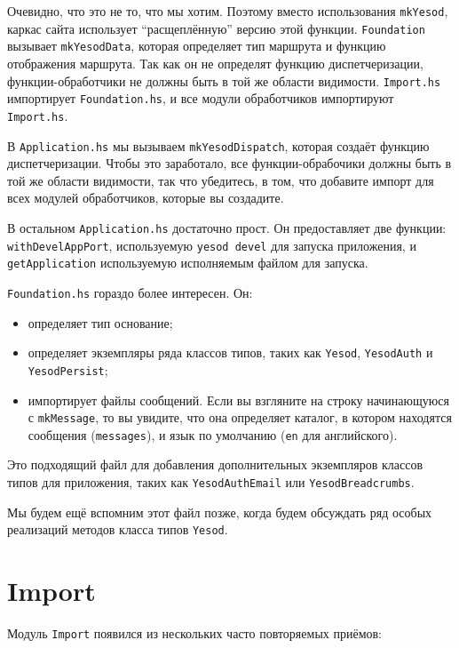 Очевидно, что это не то, что мы хотим. Поэтому вместо использования \lstinline!mkYesod!, каркас 
сайта использует ``расщеплённую'' версию этой функции. \lstinline!Foundation! вызывает \lstinline!mkYesodData!,
которая определяет тип маршрута и функцию отображения маршрута. Так как он не определят функцию диспетчеризации,
функции-обработчики не должны быть в той же области видимости. \lstinline!Import.hs! импортирует
\lstinline!Foundation.hs!, и все модули обработчиков импортируют \lstinline!Import.hs!.

В \lstinline!Application.hs! мы вызываем \lstinline!mkYesodDispatch!, которая создаёт функцию диспетчеризации.
Чтобы это заработало, все функции-обрабочики должны быть в той же области видимости, так что убедитесь, в 
том, что добавите импорт для всех модулей обработчиков, которые вы создадите.

В остальном \lstinline!Application.hs! достаточно прост. Он предоставляет две функции:
\lstinline!withDevelAppPort!, используемую \lstinline!yesod devel! для запуска приложения,
и \lstinline!getApplication! используемую исполняемым файлом для запуска.

\lstinline!Foundation.hs! гораздо более интересен. Он:
\begin{itemize}
      \item определяет тип основание;
      \item определяет экземпляры ряда классов типов, таких как \lstinline!Yesod!, \lstinline!YesodAuth! и \lstinline!YesodPersist!;
      \item импортирует файлы сообщений. Если вы взгляните на строку начинающуюся с \lstinline!mkMessage!,
        то вы увидите, что она определяет каталог, в котором находятся сообщения (\lstinline!messages!),
        и язык по умолчанию (\lstinline!en! для английского).
\end{itemize}

Это подходящий файл для добавления дополнительных экземпляров классов типов для приложения,
таких как \lstinline!YesodAuthEmail! или \lstinline!YesodBreadcrumbs!.

Мы будем ещё вспомним этот файл позже, когда будем обсуждать ряд особых реализаций
методов класса типов \lstinline!Yesod!.

\section{Import}

Модуль \lstinline!Import! появился из нескольких часто повторяемых приёмов:

